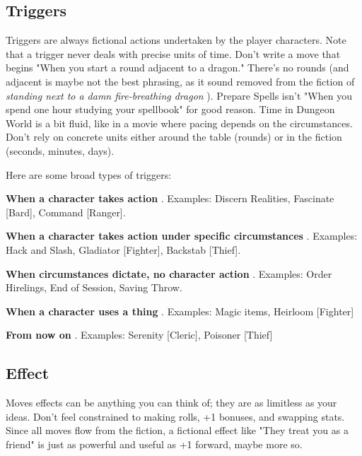  
\subsection{Triggers}   
 

Triggers are always fictional actions undertaken by the player characters. Note that a trigger never deals with precise units of time. Don't write a move that begins "When you start a round adjacent to a dragon." There's no rounds (and adjacent is maybe not the best phrasing, as it sound removed from the fiction of {\em standing next to a damn fire-breathing dragon} ). Prepare Spells isn't "When you spend one hour studying your spellbook" for good reason. Time in Dungeon World is a bit fluid, like in a movie where pacing depends on the circumstances. Don't rely on concrete units either around the table (rounds) or in the fiction (seconds, minutes, days).

 

Here are some broad types of triggers:

 
\startitemize[1,packed]

\item {\bf When a character takes action} . Examples: Discern Realities, Fascinate [Bard], Command [Ranger].

 
\item {\bf When a character takes action under specific circumstances} . Examples: Hack and Slash, Gladiator [Fighter], Backstab [Thief].

 
\item {\bf When circumstances dictate, no character action} . Examples: Order Hirelings, End of Session, Saving Throw.

 
\item {\bf When a character uses a thing} . Examples: Magic items, Heirloom [Fighter]

 
\item {\bf From now on} . Examples: Serenity [Cleric], Poisoner [Thief]


\stopitemize
 
\subsection{Effect}   
 

Moves effects can be anything you can think of; they are as limitless as your ideas. Don't feel constrained to making rolls, +1 bonuses, and swapping stats. Since all moves flow from the fiction, a fictional effect like "They treat you as a friend" is just as powerful and useful as +1 forward, maybe more so.

